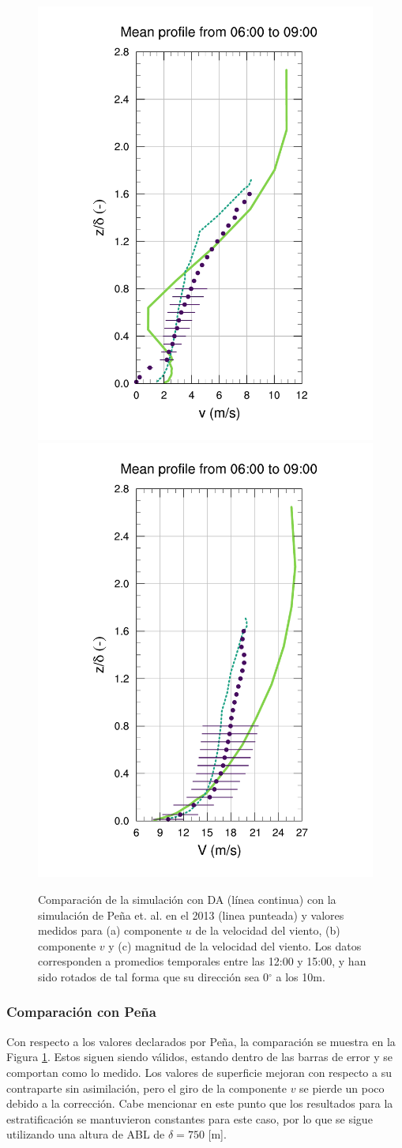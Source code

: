 \begin{figure}[H]
\begin{center}
	\includegraphics[height=0.61\linewidth,page=37,trim={48mm 10mm 38mm 25mm},clip]{Imagenes/06/hov_da/9v}%
	\includegraphics[height=0.61\linewidth,page=37,trim={48mm 10mm 38mm 25mm},clip]{Imagenes/06/hov_da/9V}%
	\end{center}
	\caption{Comparación de la simulación con DA (línea continua) con la simulación de Peña et. al. en el 2013 (linea punteada) y valores medidos para (a) componente $u$ de la velocidad del viento, (b) componente $v$ y (c) magnitud de la velocidad del viento. Los datos corresponden a promedios temporales entre las 12:00 y 15:00, y han sido rotados de tal forma que su dirección sea 0$^\circ$ a los 10m.}
	\label{fig:06_hov_da_peña}
\end{figure}
\subsubsection{Comparación con Peña}
Con respecto a los valores declarados por Peña, la comparación se muestra en la Figura \ref{fig:06_hov_da_peña}. Estos siguen siendo válidos, estando dentro de las barras de error y se comportan como lo medido. Los valores de superficie mejoran con respecto a su contraparte sin asimilación, pero el giro de la componente $v$ se pierde un poco debido a la corrección. Cabe mencionar en este punto que los resultados para la estratificación se mantuvieron constantes para este caso, por lo que se sigue utilizando una altura de ABL de $\delta=750$ [m].
